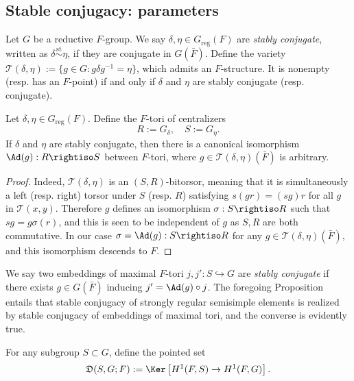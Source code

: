\documentclass[a4paper,10pt]{article}
\begin{document}
\subsection{Stable conjugacy: parameters}\label{sec:Sp-parameters}
Let $G$ be a reductive $F$-group. We say $\delta, \eta \in G_\text{reg}(F)$ are \emph{stably conjugate}, written as $\delta \stackrel{\text{st}}{\sim} \eta$, if they are conjugate in $G(\bar{F})$. Define the variety $\mathcal{T}(\delta, \eta) := \{ g \in G: g\delta g^{-1} = \eta\}$, which admits an $F$-structure. It is nonempty (resp. has an $F$-point) if and only if $\delta$ and $\eta$ are stably conjugate (resp. conjugate).

\begin{proposition}\label{prop:canonical-isom}
	Let $\delta, \eta \in G_\mathrm{reg}(F)$. Define the $F$-tori of centralizers
	\[ R := G_\delta, \quad S := G_\eta. \]
	If $\delta$ and $\eta$ are stably conjugate, then there is a canonical isomorphism $\Ad(g): R \rightiso S$ between $F$-tori, where $g \in \mathcal{T}(\delta, \eta)(\bar{F})$ is arbitrary.
\end{proposition}
\begin{proof}
	Indeed, $\mathcal{T}(\delta, \eta)$ is an $(S,R)$-bitorsor, meaning that it is simultaneously a left (resp. right) torsor under $S$ (resp. $R$) satisfying $s(gr) = (sg)r$ for all $g$ in $\mathcal{T}(x,y)$. Therefore $g$ defines an isomorphism $\sigma: S \rightiso R$ such that $sg = g\sigma(r)$, and this is seen to be independent of $g$ as $S,R$ are both commutative. In our case $\sigma = \Ad(g): S \rightiso R$ for any $g \in \mathcal{T}(\delta, \eta)(\bar{F})$, and this isomorphism descends to $F$.
\end{proof}

We say two embeddings of maximal $F$-tori $j,j': S \hookrightarrow G$ are \emph{stably conjugate} if there exists $g \in G(\bar{F})$ inducing $j' = \Ad(g) \circ j$. The foregoing Proposition entails that stable conjugacy of strongly regular semisimple elements is realized by stable conjugacy of embeddings of maximal tori, and the converse is evidently true.

\begin{definition}
	For any subgroup $S \subset G$, define the pointed set
	\[ \mathfrak{D}(S, G; F) := \Ker\left[ H^1(F, S) \to H^1(F, G) \right]. \]
\end{definition}
\end{document}
